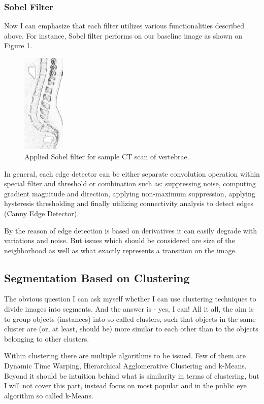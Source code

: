 \subsubsection{Sobel Filter}
Now I can emphasize that each filter utilizes various functionalities described above.
For instance, Sobel filter performs on our baseline image as shown on Figure \ref{fig:sobel}.

\begin{figure}[h] 
\centering
\includegraphics[width=2cm]{images/sample_vertebrae_sobel.jpeg}
    \caption {Applied Sobel filter for sample CT scan of vertebrae.}
    \label{fig:sobel}
\end{figure}

In general, each edge detector can be either separate convolution operation within special filter and threshold or combination such as: suppressing noise, computing gradient magnitude and direction, applying non-maximum suppression, applying hysteresis thresholding and finally utilizing connectivity analysis to detect edges (Canny Edge Detector). 

By the reason of edge detection is based on derivatives it can easily degrade with variations and noise. But issues which should be considered are size of the neighborhood as well as what exactly represents a transition on the image. 

\subsection{Segmentation Based on Clustering}
The obvious question I can ask myself whether I can use clustering techniques to divide images into segments. And the answer is - yes, I can! All it all, the aim is to group objects (instances) into so-called clusters, such that objects in the same cluster are (or, at least, should be) more similar to each other than to the objects belonging to other clusters. 

Within clustering there are multiple algorithms to be issued. Few of them are 
Dynamic Time Warping, Hierarchical Agglomerative Clustering and k-Means. Beyond it should be intuition behind what is similarity in terms of clustering, but I will not cover this part, instead focus on most popular and in the public eye algorithm so called k-Means.  


